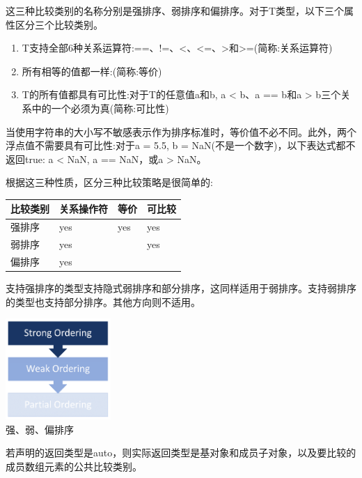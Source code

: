 这三种比较类别的名称分别是强排序、弱排序和偏排序。对于T类型，以下三个属性区分三个比较类别。

\begin{enumerate}
\item 
T支持全部6种关系运算符:==、!=、<、<=、>和>=(简称:关系运算符)

\item 
所有相等的值都一样:(简称:等价)

\item 
T的所有值都具有可比性:对于T的任意值a和b, a < b、a == b和a > b三个关系中的一个必须为真(简称:可比性)
\end{enumerate}

当使用字符串的大小写不敏感表示作为排序标准时，等价值不必不同。此外，两个浮点值不需要具有可比性:对于a = 5.5, b = NaN(不是一个数字)，以下表达式都不返回true: a < NaN, a == NaN，或a > NaN。

根据这三种性质，区分三种比较策略是很简单的:

\begin{table}[H]
\centering
\begin{tabular}{llll}
比较类别 & 关系操作符 & 等价 & 可比较 \\ \hline
强排序     & yes                 & yes         & yes        \\
弱排序       & yes                 &             & yes        \\
偏排序    & yes                 &             &           
\end{tabular}
\end{table}

支持强排序的类型支持隐式弱排序和部分排序，这同样适用于弱排序。支持弱排序的类型也支持部分排序。其他方向则不适用。

\begin{center}
\includegraphics[width=0.3\textwidth]{content/3/chapter4/images/29.png}\\
强、弱、偏排序
\end{center}

若声明的返回类型是auto，则实际返回类型是基对象和成员子对象，以及要比较的成员数组元素的公共比较类别。

